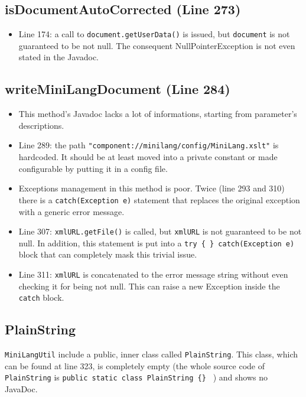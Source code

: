 \documentclass[11pt]{article} %
\begin{document}
\subsection{isDocumentAutoCorrected (Line 273)}
\begin{itemize}
	\item Line 174: a call to \texttt{document.getUserData()} is issued, but \texttt{document} is not guaranteed to be not null. The consequent NullPointerException is not even stated in the Javadoc.
\end{itemize}

\subsection{writeMiniLangDocument (Line 284)}
\begin{itemize}
	\item This method's Javadoc lacks a lot of informations, starting from parameter's descriptions.
	\item Line 289: the path \texttt{"component://minilang/config/MiniLang.xslt"} is hardcoded. It should be at least moved into a private constant or made configurable by putting it in a config file.
	\item Exceptions management in this method is poor. Twice (line 293 and 310) there is a \texttt{catch(Exception e)} statement that replaces the original exception with a generic error message.
	\item Line 307: \texttt{xmlURL.getFile()} is called, but \texttt{xmlURL} is not guaranteed to be not null. In addition, this statement is put into a \texttt{try \{ \} catch(Exception e)} block that can completely mask this trivial issue.
	\item Line 311: \texttt{xmlURL} is concatenated to the error message string without even checking it for being not null. This can raise a new Exception inside the \texttt{catch} block.
\end{itemize}

\subsection{PlainString}

\texttt{MiniLangUtil} include a public, inner class called \texttt{PlainString}. This class, which can be found at line 323, is completely empty (the whole source code of \texttt{PlainString} is \texttt{public static class PlainString \{\} }  ) and shows no JavaDoc.
\end{document}
